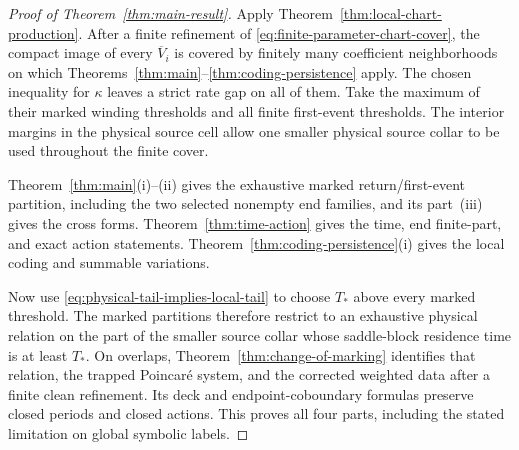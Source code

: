 \documentclass[11pt]{amsart}
\numberwithin{equation}{section}
\theoremstyle{definition}
\theoremstyle{remark}
\begin{document}
\begin{proof}[Proof of Theorem~\ref{thm:main-result}]
Apply Theorem~\ref{thm:local-chart-production}.  After a finite refinement
of \eqref{eq:finite-parameter-chart-cover}, the compact image of every
$\overline V_i$ is covered by finitely many coefficient neighborhoods on
which Theorems~\ref{thm:main}--\ref{thm:coding-persistence} apply.  The
chosen inequality for $\kappa$ leaves a strict rate gap on all of them.
Take the maximum of their marked winding thresholds and all finite
first-event thresholds.  The interior margins in the physical source cell
allow one smaller physical source collar to be used throughout the finite
cover.

Theorem~\ref{thm:main}\textup{(i)--(ii)} gives the exhaustive marked
return/first-event partition, including the two selected nonempty end
families, and its part~\textup{(iii)} gives the cross forms.
Theorem~\ref{thm:time-action} gives the time, end finite-part, and exact
action statements.  Theorem~\ref{thm:coding-persistence}\textup{(i)} gives
the local coding and summable variations.

Now use \eqref{eq:physical-tail-implies-local-tail} to choose $T_*$ above
every marked threshold.  The marked partitions therefore restrict to an
exhaustive physical relation on the part of the smaller source collar whose
saddle-block residence time is at least $T_*$.  On overlaps,
Theorem~\ref{thm:change-of-marking} identifies that relation, the trapped
Poincar\'e system, and the corrected weighted data after a finite clean
refinement.  Its deck and endpoint-coboundary formulas preserve closed
periods and closed actions.  This proves all four parts, including the
stated limitation on global symbolic labels.
\end{proof}
\end{document}
